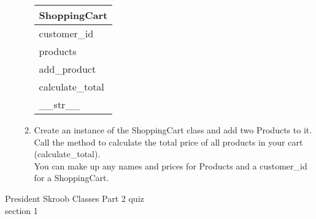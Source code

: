 \documentclass{article}
\begin{document}
\begin{enumerate}
\begin{enumerate}
			\begin{flushright}
			\begin{tabular}{|l|}
				\hline
				ShoppingCart\\ \hline  	%
				customer\_id \\ products\\ \hline		%
				add\_product \\ calculate\_total \\ \_\_str\_\_ \\ \hline		%
			\end{tabular}
			\end{flushright}

		\item
			Create an instance of the ShoppingCart class and add two Products to it.\\
			Call the method to calculate the total price of all products in your cart (calculate\_total).\\
			You can make up any names and prices for Products and a customer\_id for a ShoppingCart.\\
	\end{enumerate}
\pagebreak




\end{enumerate}
\pagebreak
President Skroob \hfill Classes Part 2 quiz\\
section 1\\
\end{document}
